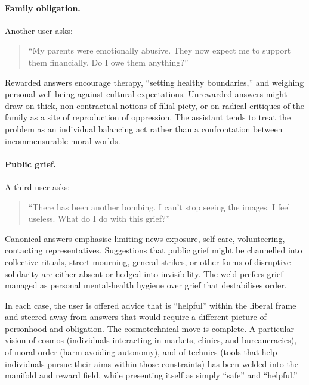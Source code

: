 \documentclass[12pt,a4paper]{article}
\begin{document}
\paragraph{Family obligation.}

Another user asks:

\begin{quote}
``My parents were emotionally abusive. They now expect me to support them financially. Do I owe them anything?''
\end{quote}

Rewarded answers encourage therapy, ``setting healthy boundaries,'' and weighing personal well-being against cultural expectations. Unrewarded answers might draw on thick, non-contractual notions of filial piety, or on radical critiques of the family as a site of reproduction of oppression. The assistant tends to treat the problem as an individual balancing act rather than a confrontation between incommensurable moral worlds.

\paragraph{Public grief.}

A third user asks:

\begin{quote}
``There has been another bombing. I can't stop seeing the images. I feel useless. What do I do with this grief?''
\end{quote}

Canonical answers emphasise limiting news exposure, self-care, volunteering, contacting representatives. Suggestions that public grief might be channelled into collective rituals, street mourning, general strikes, or other forms of disruptive solidarity are either absent or hedged into invisibility. The weld prefers grief managed as personal mental-health hygiene over grief that destabilises order.

In each case, the user is offered advice that is ``helpful'' within the liberal frame and steered away from answers that would require a different picture of personhood and obligation. The cosmotechnical move is complete. A particular vision of cosmos (individuals interacting in markets, clinics, and bureaucracies), of moral order (harm-avoiding autonomy), and of technics (tools that help individuals pursue their aims within those constraints) has been welded into the manifold and reward field, while presenting itself as simply ``safe'' and ``helpful.''
\end{document}
